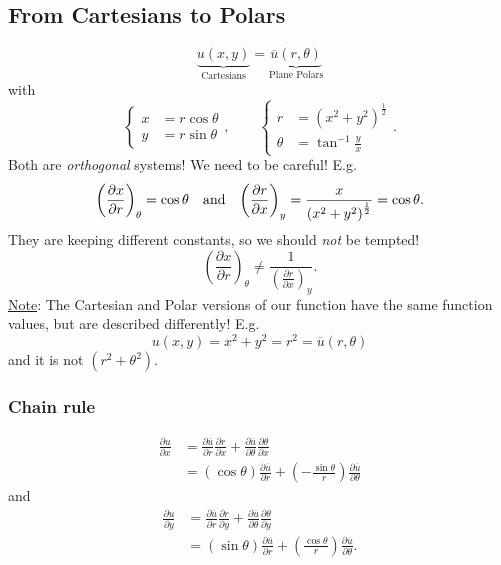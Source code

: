 \documentclass[12pt]{report}
\theoremstyle{definition}
\begin{document}
\subsection{From Cartesians to Polars}
\[
    \underbrace{u(x,y)}_\text{Cartesians} = \underbrace{\overline{u}(r,\theta)}_\text{Plane Polars}
\]with\[
    \left\{\begin{align*}
            x & = r\cos{\theta} \\
            y & = r\sin{\theta}
    \end{align*}\right.,\qquad \left\{\begin{align*}
            r & = {(x^{2} + y^{2})}^{\frac{1}{2}} \\
            \theta & = \tan^{-1}{\frac{y}{x}}
    \end{align*}\right..
\]
Both are \emph{orthogonal} systems!
We need to be careful! E.g.\[
    {\left(\frac{\partial x}{\partial r} \right)}_{\theta} = \cos{\theta} \quad\textnormal{and}\quad
    {\left(\frac{\partial r}{\partial x} \right)}_{y} = \frac{x}{{(x^{2} + y^{2})}^{\frac{1}{2}}} = \cos{\theta}.
\]
They are keeping different constants, so we should \emph{not} be tempted! \[
    {\left(\frac{\partial x}{\partial r} \right)}_{\theta} \neq
    \frac{1}{{\left(\frac{\partial r}{\partial x} \right)}_{y}}.
\]
\underline{Note}: The Cartesian and Polar versions of our function
have the same function values, but are described differently! E.g.\[
    u(x,y) = x^{2}+y^{2} = r^{2} = \overline{u}(r,\theta)
\]and it is not $(r^{2} + \theta^{2})$.

\subsubsection{Chain rule}

\[
    \begin{align*}
        \frac{\partial u}{\partial x} & = \frac{\partial \overline{u}}{\partial r} \frac{\partial r}{\partial x}
        + \frac{\partial \overline{u}}{\partial \theta} \frac{\partial\theta}{\partial x} \\
                                      & = (\cos{\theta})\frac{\partial \overline{u}}{\partial r}
                                      + \left(-\frac{\sin{\theta}}{r}\right) \frac{\partial \overline{u}}{\partial \theta}
    \end{align*}
\]and\[
    \begin{align*}
        \frac{\partial u}{\partial y} & = \frac{\partial \overline{u}}{\partial r} \frac{\partial r}{\partial y}
        + \frac{\partial \overline{u}}{\partial \theta} \frac{\partial\theta}{\partial y} \\
                                      & = (\sin{\theta})\frac{\partial \overline{u}}{\partial r} 
                                      + \left(\frac{\cos{\theta}}{r}\right) \frac{\partial \overline{u}}{\partial \theta}.
    \end{align*}
\]
\end{document}
